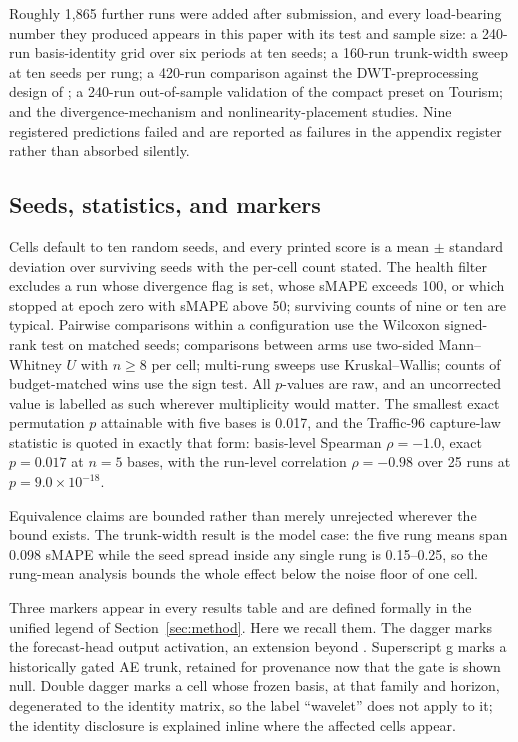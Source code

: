Roughly 1{,}865 further runs were added after submission, and every
load-bearing number they produced appears in this paper with its test
and sample size: a 240-run basis-identity grid over six periods at ten
seeds; a 160-run trunk-width sweep at ten seeds per rung; a 420-run
comparison against the DWT-preprocessing design of
\citet{pramanick2024fusion}; a 240-run out-of-sample validation of the
compact preset on Tourism; and the divergence-mechanism and
nonlinearity-placement studies. Nine registered predictions failed and
are reported as failures in the appendix register rather than absorbed
silently.

\subsection{Seeds, statistics, and markers}
\label{sec:setup:stats}

Cells default to ten random seeds, and every printed score is a mean
$\pm$ standard deviation over surviving seeds with the per-cell count
stated. The health filter excludes a run whose divergence flag is set,
whose sMAPE exceeds 100, or which stopped at epoch zero with sMAPE above
50; surviving counts of nine or ten are typical. Pairwise comparisons
within a configuration use the Wilcoxon signed-rank test on matched
seeds; comparisons between arms use two-sided Mann--Whitney $U$ with
$n \geq 8$ per cell; multi-rung sweeps use Kruskal--Wallis; counts of
budget-matched wins use the sign test. All $p$-values are raw, and an
uncorrected value is labelled as such wherever multiplicity would
matter. The smallest exact permutation $p$ attainable with five bases is
0.017, and the Traffic-96 capture-law statistic is quoted in exactly
that form: basis-level Spearman $\rho = -1.0$, exact $p = 0.017$ at
$n = 5$ bases, with the run-level correlation $\rho = -0.98$ over 25
runs at $p = 9.0 \times 10^{-18}$.

Equivalence claims are bounded rather than merely unrejected wherever
the bound exists. The trunk-width result is the model case: the five
rung means span 0.098 sMAPE while the seed spread inside any single rung
is 0.15--0.25, so the rung-mean analysis bounds the whole effect below
the noise floor of one cell.

Three markers appear in every results table and are defined formally in
the unified legend of Section~\ref{sec:method}. Here we recall them.
The dagger marks the forecast-head output activation, an extension
beyond \citet{oreshkin2020nbeats}. Superscript g marks a historically
gated AE trunk, retained for provenance now that the gate is shown
null. Double dagger marks a cell whose frozen basis, at that family and
horizon, degenerated to the identity matrix, so the label ``wavelet''
does not apply to it; the identity disclosure is explained inline where
the affected cells appear.

